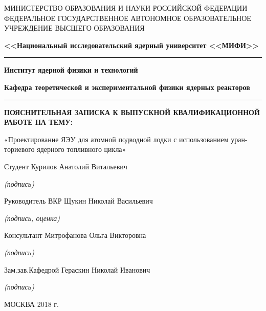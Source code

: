 \begin{center}
	\small{МИНИСТЕРСТВО ОБРАЗОВАНИЯ И НАУКИ РОССИЙСКОЙ ФЕДЕРАЦИИ}
\footnotesize{ФЕДЕРАЛЬНОЕ ГОСУДАРСТВЕННОЕ АВТОНОМНОЕ ОБРАЗОВАТЕЛЬНОЕ УЧРЕЖДЕНИЕ 
		ВЫСШЕГО ОБРАЗОВАНИЯ}
	
	
	\large{\textbf{<<Национальный исследовательский ядерный университет <<МИФИ>>}}
	
	\rule{\textwidth}{.15mm}
	
	\textbf{Институт ядерной физики и технологий}
	
	\textbf{Кафедра теоретической и экспериментальной физики ядерных реакторов}
	
	\rule{\textwidth}{.15mm}
	
	\vspace{1cm}
	
	\textbf{ПОЯСНИТЕЛЬНАЯ ЗАПИСКА
		К ВЫПУСКНОЙ КВАЛИФИКАЦИОННОЙ РАБОТЕ НА ТЕМУ:}
	
    «Проектирование ЯЭУ для атомной подводной лодки с использованием уран-ториевого ядерного топливного цикла» 
	
\end{center}

\vspace{1cm}
Студент \hfill Курилов Анатолий Витальевич \hfill\underline{\hspace{4cm}}

\hfill \textit {(подпись)\hspace{7mm}}

Руководитель ВКР \hfill Щукин Николай Васильевич \hfill\underline{\hspace{4cm}}

\hfill \textit {(подпись, оценка)\hspace{0mm}}

Консультант \hfill Митрофанова Ольга Викторовна  \hfill\underline{\hspace{4cm}}

\hfill \textit {(подпись)\hspace{7mm}}

Зам.зав.Кафедрой  \hfill Гераскин Николай Иванович  \hfill\underline{\hspace{4cm}}

\hfill \textit {(подпись)\hspace{7mm}}




\vfill

\centering МОСКВА 2018 г.

\pagebreak
